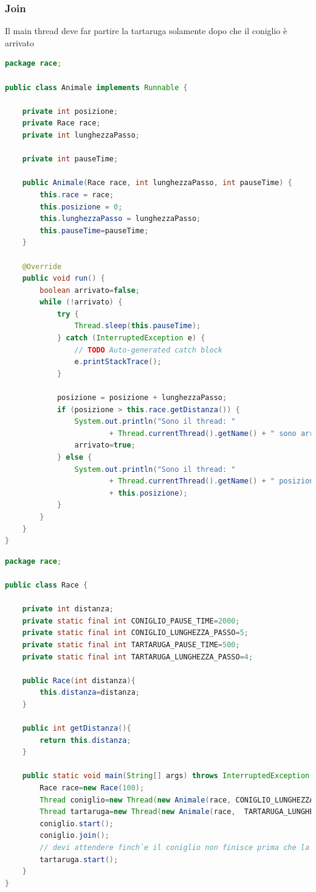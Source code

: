 \documentclass{article}
\begin{document}
\subsubsection{Join}
\begin{framed}
Il main thread deve far partire la tartaruga solamente dopo che il coniglio \`e arrivato
\end{framed}
\begin{lstlisting}[language=Java]
package race;

public class Animale implements Runnable {

	private int posizione;
	private Race race;
	private int lunghezzaPasso;
	
	private int pauseTime;

	public Animale(Race race, int lunghezzaPasso, int pauseTime) {
		this.race = race;
		this.posizione = 0;
		this.lunghezzaPasso = lunghezzaPasso;
		this.pauseTime=pauseTime;
	}

	@Override
	public void run() {
		boolean arrivato=false;
		while (!arrivato) {
			try {
				Thread.sleep(this.pauseTime);
			} catch (InterruptedException e) {
				// TODO Auto-generated catch block
				e.printStackTrace();
			}
			
			posizione = posizione + lunghezzaPasso;
			if (posizione > this.race.getDistanza()) {
				System.out.println("Sono il thread: "
						+ Thread.currentThread().getName() + " sono arrivato");
				arrivato=true;
			} else {
				System.out.println("Sono il thread: "
						+ Thread.currentThread().getName() + " posizione "
						+ this.posizione);
			}
		}
	}
}
\end{lstlisting}

\begin{lstlisting}[language=Java]
package race;

public class Race {
	
	private int distanza;
	private static final int CONIGLIO_PAUSE_TIME=2000;
	private static final int CONIGLIO_LUNGHEZZA_PASSO=5;
	private static final int TARTARUGA_PAUSE_TIME=500;
	private static final int TARTARUGA_LUNGHEZZA_PASSO=4;
	
	public Race(int distanza){
		this.distanza=distanza;
	}
	
	public int getDistanza(){
		return this.distanza;
	}
	
	public static void main(String[] args) throws InterruptedException {
		Race race=new Race(100);
		Thread coniglio=new Thread(new Animale(race, CONIGLIO_LUNGHEZZA_PASSO, CONIGLIO_PAUSE_TIME), "CONIGLIO");
		Thread tartaruga=new Thread(new Animale(race,  TARTARUGA_LUNGHEZZA_PASSO, TARTARUGA_LUNGHEZZA_PASSO), "TARTARUGA");
		coniglio.start();
		coniglio.join();
		// devi attendere finch`e il coniglio non finisce prima che la tartaruga parta
		tartaruga.start();
	}
}
\end{lstlisting}
\end{document}
